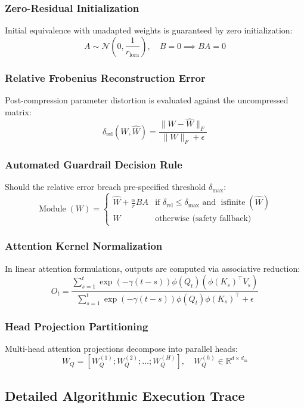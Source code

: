 \documentclass{article}
\begin{document}
\subsubsection{Zero-Residual Initialization}
Initial equivalence with unadapted weights is guaranteed by zero initialization:
\[
A \sim \mathcal{N}\left(0, \frac{1}{r_{\text{lora}}}\right), \quad B = 0 \implies B A = 0
\]

\subsubsection{Relative Frobenius Reconstruction Error}
Post-compression parameter distortion is evaluated against the uncompressed matrix:
\[
\delta_{\text{rel}}(W, \hat{W}) = \frac{\|W - \hat{W}\|_F}{\|W\|_F + \epsilon}
\]

\subsubsection{Automated Guardrail Decision Rule}
Should the relative error breach pre-specified threshold $\delta_{\text{max}}$:
\[
\operatorname{Module}(W) = \begin{cases} \hat{W} + \frac{\alpha}{r} B A & \text{if } \delta_{\text{rel}} \le \delta_{\text{max}} \text{ and } \operatorname{isfinite}(\hat{W}) \\ W & \text{otherwise (safety fallback)} \end{cases}
\]

\subsubsection{Attention Kernel Normalization}
In linear attention formulations, outputs are computed via associative reduction:
\[
O_t = \frac{\sum_{s=1}^{t} \exp(-\gamma (t-s)) \phi(Q_t) (\phi(K_s)^\top V_s)}{\sum_{s=1}^{t} \exp(-\gamma (t-s)) \phi(Q_t) \phi(K_s)^\top + \epsilon}
\]

\subsubsection{Head Projection Partitioning}
Multi-head attention projections decompose into parallel heads:
\[
W_Q = [W_Q^{(1)}; W_Q^{(2)}; \dots; W_Q^{(H)}], \quad W_Q^{(h)} \in \mathbb{R}^{d \times d_{\text{in}}}
\]

\subsection{Detailed Algorithmic Execution Trace}
\end{document}
